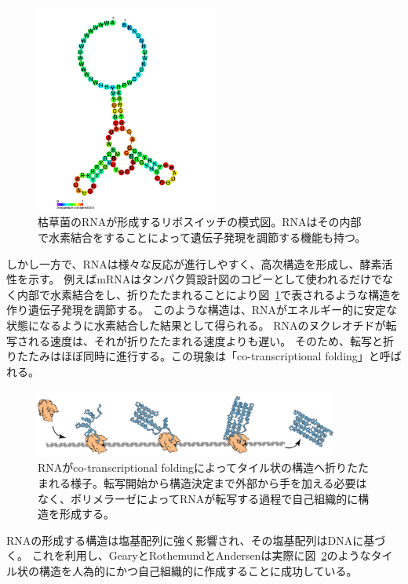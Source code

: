 \documentclass[a4,11pt]{article}
\begin{document}
\begin{figure}[tb]
	\centering
	\includegraphics[width=6cm]{fig/cp/RF00167.jpg}
	\caption{枯草菌のRNAが形成するリボスイッチの模式図。RNAはその内部で水素結合をすることによって遺伝子発現を調節する機能も持つ。}
	\label{fig:riboswitch}
\end{figure}

しかし一方で、RNAは様々な反応が進行しやすく、高次構造を形成し、酵素活性を示す。
例えばmRNAはタンパク質設計図のコピーとして使われるだけでなく内部で水素結合をし、折りたたまれることにより図~\ref{fig:riboswitch}で表されるような構造を作り遺伝子発現を調節する\cite{direct}。
このような構造は、RNAがエネルギー的に安定な状態になるように水素結合した結果として得られる。
RNAのヌクレオチドが転写される速度は、それが折りたたまれる速度よりも遅い\cite{encoding}。
そのため、転写と折りたたみはほぼ同時に進行する。この現象は「co-transcriptional folding」と呼ばれる。

\begin{figure}[h]
	\centering
	\includegraphics[width=10cm]{fig/cp/rna_origami.pdf}
	\caption{RNAがco-transcriptional foldingによってタイル状の構造へ折りたたまれる様子。転写開始から構造決定まで外部から手を加える必要はなく、ポリメラーゼによってRNAが転写する過程で自己組織的に構造を形成する。}
	\label{fig:rnaorigami}
\end{figure}

RNAの形成する構造は塩基配列に強く影響され、その塩基配列はDNAに基づく。
これを利用し、GearyとRothemundとAndersenは実際に図~\ref{fig:rnaorigami}のようなタイル状の構造を人為的にかつ自己組織的に作成することに成功している\cite{rnaorigami}。
\end{document}
